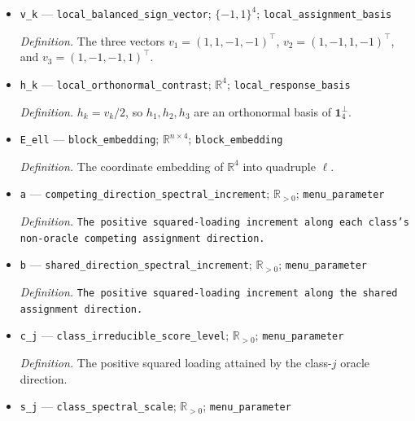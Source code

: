\documentclass{article}
\begin{document}
\begin{itemize}
  \par\smallskip\noindent\emph{Definition.} \(P_n=I_n-\mathbf 1_n\mathbf 1_n^\top/n\).
  \item \texttt{v\_\allowbreak{}k} --- \texttt{local\_\allowbreak{}balanced\_\allowbreak{}sign\_\allowbreak{}vector}; \(\{-1,1\}^4\); \texttt{local\_\allowbreak{}assignment\_\allowbreak{}basis}
  \par\smallskip\noindent\emph{Definition.} The three vectors \(v_1=(1,1,-1,-1)^\top\), \(v_2=(1,-1,1,-1)^\top\), and \(v_3=(1,-1,-1,1)^\top\).
  \item \texttt{h\_\allowbreak{}k} --- \texttt{local\_\allowbreak{}orthonormal\_\allowbreak{}contrast}; \(\mathbb R^4\); \texttt{local\_\allowbreak{}response\_\allowbreak{}basis}
  \par\smallskip\noindent\emph{Definition.} \(h_k=v_k/2\), so \(h_1,h_2,h_3\) are an orthonormal basis of \(\mathbf 1_4^\perp\).
  \item \texttt{E\_\allowbreak{}ell} --- \texttt{block\_\allowbreak{}embedding}; \(\mathbb R^{n\times4}\); \texttt{block\_\allowbreak{}embedding}
  \par\smallskip\noindent\emph{Definition.} The coordinate embedding of \(\mathbb R^4\) into quadruple \(\ell\).
  \item \texttt{a} --- \texttt{competing\_\allowbreak{}direction\_\allowbreak{}spectral\_\allowbreak{}increment}; \(\mathbb R_{>0}\); \texttt{menu\_\allowbreak{}parameter}
  \par\smallskip\noindent\emph{Definition.} \texttt{The positive squared-\allowbreak{}loading increment along each class's non-\allowbreak{}oracle competing assignment direction.}
  \item \texttt{b} --- \texttt{shared\_\allowbreak{}direction\_\allowbreak{}spectral\_\allowbreak{}increment}; \(\mathbb R_{>0}\); \texttt{menu\_\allowbreak{}parameter}
  \par\smallskip\noindent\emph{Definition.} \texttt{The positive squared-\allowbreak{}loading increment along the shared assignment direction.}
  \item \texttt{c\_\allowbreak{}j} --- \texttt{class\_\allowbreak{}irreducible\_\allowbreak{}score\_\allowbreak{}level}; \(\mathbb R_{>0}\); \texttt{menu\_\allowbreak{}parameter}
  \par\smallskip\noindent\emph{Definition.} The positive squared loading attained by the class-\(j\) oracle direction.
  \item \texttt{s\_\allowbreak{}j} --- \texttt{class\_\allowbreak{}spectral\_\allowbreak{}scale}; \(\mathbb R_{>0}\); \texttt{menu\_\allowbreak{}parameter}

\end{itemize}
\end{document}
